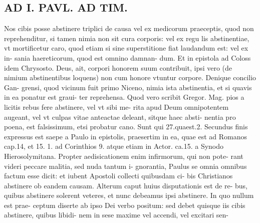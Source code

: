 \documentclass{article}
\begin{document}
\begin{pages}
\section*{AD I. PAVL. AD TIM. }
\marginpar{[ p.310 ]}\pstart Nos cibis posse abstinere triplici de causa vel ex medicorum praeceptis, quod non reprehenditur, si tamen nimia non sit cura corporis: vel ex regu lis abstinentiae, vt mortificetur caro, quod etiam si sine superstitione fiat laudandum est: vel ex in- sania haereticorum, quod est omnino damnan- dum. Et in epistola ad Coloss idem Chrysosto. Deus, ait, corpori honorem suum contribuit, ipsi vero (de nimium abstinentibus loquens) non cum honore vtuntur corpore. Denique concilio Gan- grensi, quod vicinum fuit primo Niceno, nimia ista abstinentia, et si quavis in ea ponatur est graui- ter reprehensa. Quod vero scribit Gregor. Mag. pios a licitis rebus fere abstinere, vel vt sibi me- rita apud Deum omnipotentem augeant, vel vt culpas vitae anteactae deleant, sitque haec absti- nentia pro poena, est falsissimum, etsi probatur cano. Sunt qui 27.quaest.2. Secundus finis expressus est saepe a Paulo in epistolis, praesertim in ea, quae est ad Romanos cap.14, et 15. 1. ad Corinthios 9. atque etiam in Actor. ca.15. a Synodo Hierosolymitana. Propter aedisicationem enim infirmorum, qui non pote- rant videri peccare malitia, sed nuda tantum i- gnorantia, Paulus se omnia omnibus factum esse dicit: et iubent Apostoli collecti quibusdam ci- bis Christianos abstinere ob eandem causam. Alterum caput huius disputationis est de re- bus, quibus abstinere solerent veteres, et nunc debeamus ipsi abstinere. In quo nullum est prae- ceptum diserte ab ipso Dei verbo positum: sed debet quisque iis cibis abstinere, quibus libidi- nem in sese maxime vel accendi, vel excitari sen-  \pend

\end{pages}
\end{document}
